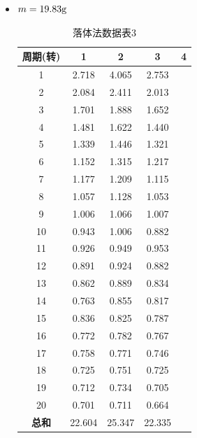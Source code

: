 \documentclass[12pt,hyperref,a4paper,UTF8]{ctexart}
\begin{document}
\begin{itemize}
            \item $m=19.83\text g$
                \begin{table}[h!]
                    \centering
                    \begin{tabular}{ccccc}
                    \toprule
                    \textbf{周期(转)} & \textbf{1} & \textbf{2} & \textbf{3} & \textbf{4} \\
                    \midrule
                    1  & 2.718 & 4.065 & 2.753 \\
                    2  & 2.084 & 2.411 & 2.013 \\
                    3  & 1.701 & 1.888 & 1.652 \\
                    4  & 1.481 & 1.622 & 1.440 \\
                    5  & 1.339 & 1.446 & 1.321 \\
                    6  & 1.152 & 1.315 & 1.217 \\
                    7  & 1.177 & 1.209 & 1.115 \\
                    8  & 1.057 & 1.128 & 1.053 \\
                    9  & 1.006 & 1.066 & 1.007 \\
                    10 & 0.943 & 1.006 & 0.882 \\
                    11 & 0.926 & 0.949 & 0.953 \\
                    12 & 0.891 & 0.924 & 0.882 \\
                    13 & 0.862 & 0.889 & 0.834 \\
                    14 & 0.763 & 0.855 & 0.817 \\
                    15 & 0.836 & 0.825 & 0.787 \\
                    16 & 0.772 & 0.782 & 0.767 \\
                    17 & 0.758 & 0.771 & 0.746 \\
                    18 & 0.725 & 0.751 & 0.725 \\
                    19 & 0.712 & 0.734 & 0.705 \\
                    20 & 0.701 & 0.711 & 0.664 \\
                    \midrule
                    \textbf{总和} & 22.604 & 25.347 & 22.335 \\
                    \bottomrule
                    \end{tabular}
                    \caption{落体法数据表3}
                    \end{table}
                    


\end{itemize}
\end{document}
